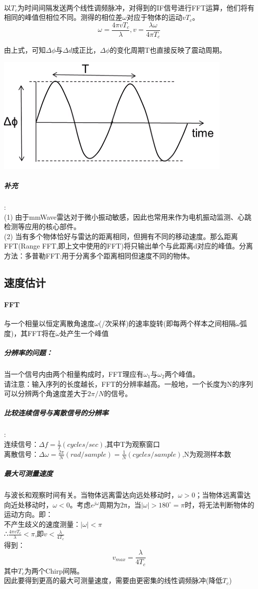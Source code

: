 \documentclass[UTF8]{ctexart}
\begin{document}
\paragraph{}以$T_c$为时间间隔发送两个线性调频脉冲，对得到的IF信号进行FFT运算，他们将有相同的峰值但相位不同。测得的相位差$\omega$对应于物体的运动$vT_c$。\\
\[\omega=\frac{4\pi v T_c}{\lambda} ,v=\frac{\lambda \omega}{4\pi T_c}\]



由上式，可知$\Delta \phi$与$\Delta d$成正比，$\Delta \phi$的变化周期T也直接反映了震动周期。

{\centering \includegraphics[width = .4\textwidth]{pic/deltaphase.png}

}

\subparagraph{补充}:\\
(1) 由于mmWave雷达对于微小振动敏感，因此也常用来作为电机振动监测、心跳检测等应用的核心部件。\\
(2) 当有多个物体恰好与雷达的距离相同，但拥有不同的移动速度。那么距离FFT(Range FFT,即上文中使用的FFT)将只输出单个与此距离d对应的峰值。分离方法：多普勒FFT:用于分离多个距离相同但速度不同的物体。
\subsection{速度估计}
\paragraph{FFT}与一个相量以恒定离散角速度$\omega$(/次采样)的速率旋转(即每两个样本之间相隔$\omega$弧度)，其FFT将在$\omega$处产生一个峰值
\subparagraph{分辨率的问题：}
当一个信号内由两个相量构成时，FFT理应有$\omega_1$与$\omega_2$两个峰值。\\
请注意：输入序列的长度越长，FFT的分辨率越高。一般地，一个长度为N的序列可以分辨两个角速度差大于$2\pi/N$的信号。
\subparagraph{比较连续信号与离散信号的分辨率}:\\
	连续信号：$\Delta f=\frac{1}{T} (cycles/sec)$,其中T为观察窗口\\
	离散信号：$\Delta \omega=\frac{2\pi}{N}(rad/sample) = \frac{1}{N} (cycles/sample)$,N为观测样本数
\subparagraph{最大可测量速度}与波长和观察时间有关。当物体远离雷达向远处移动时，$\omega>0$；当物体远离雷达向近处移动时，$\omega<0$。考虑$e^{j\omega}$周期为2π，当$|\omega|>180^\circ=\pi$时，将无法判断物体的运动方向。即：\\
不产生歧义的速度测量：$|\omega|<\pi$\\
∴$\frac{4\pi v T_c}{\lambda}<\pi$,即$v<\frac{\lambda}{4T_c}$\\
得到：\[v_{max}=\frac{\lambda}{4T_c}\]其中$T_c$为两个Chirp间隔。\\
因此要得到更高的最大可测量速度，需要由更密集的线性调频脉冲(降低$T_c$)
\end{document}
